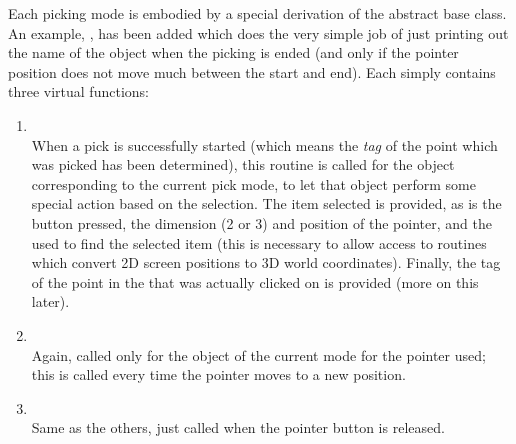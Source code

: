 Each picking mode is embodied by a special derivation of the  abstract base class.  An example, , has been added which does the very simple job of just printing out the name of the  object when the picking is ended (and only if the pointer position does not move much between the start and end).  Each  simply contains three virtual functions:
\begin{enumerate}
  \item {} \\
When a pick is successfully started (which means the {\em tag} of the point which was picked has been determined), this routine is called for the  object corresponding to the current pick mode, to let that object perform some special action based on the selection.  The item selected is provided, as is the button pressed, the dimension (2 or 3) and position of the pointer, and the  used to find the selected item (this is necessary to allow access to routines which convert 2D screen positions to 3D world coordinates).  Finally, the tag of the point in the  that was actually clicked on is provided (more on this later).
  \item {} \\
Again, called only for the  object of the current mode for the pointer used; this is called every time the pointer moves to a new position.
  \item {} \\
Same as the others, just called when the pointer button is released.
\end{enumerate}

